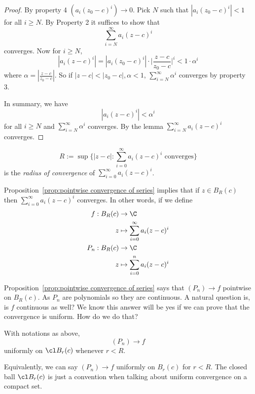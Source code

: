 \documentclass[a4paper]{article}
\theoremstyle{definition}
\begin{document}
\begin{proof}
  By property 4 \((a_i(z_0-c)^i)\to 0\). Pick \(N\) such that \(|a_i(z_0-c)^i|<1\) for all \(i\geq N\). By Property 2 it suffices to show that
  \[
    \sum_{i=N}^{\infty}a_i(z-c)^i
  \]
  converges. Now for \(i\geq N\),
  \[
    \label{eqn:fundamental est}
    \boxed{
    |a_i(z-c)^i| = |a_i(z_0-c)^i| \cdot \Big| \frac{z-c}{z_0-c} \Big|^i < 1\cdot \alpha^i
    }
    \tag*{Fundamental Estimate for Power Series}
    \]
  where \(\alpha = |\frac{z-c}{z_0-c}|\). So if \(|z-c| < |z_0-c|,\alpha<1\), \(\sum_{i=N}^{\infty}\alpha^i \) converges by property 3.

  In summary, we have
  \[
|a_i(z-c)^i| < \alpha^i
\]
for all \(i\geq N\) and \(\sum_{i=N}^{\infty}\alpha^i \) converges. By the lemma \(\sum_{i=N}^{\infty}a_i(z-c)^i \) converges.
\end{proof}

\begin{defi}
  \[
    R := \sup \{ |z-c|: \sum_{i=0}^{\infty}a_i (z-c)^i \text{ converges}\}
  \]
  is the \emph{radius of convergence} of \(\sum_{i=0}^{\infty}a_i(z-c)^i \).
\end{defi}

Proposition~\ref{prop:pointwise convergence of series} implies that if \(z\in B_R(c)\) then \(\sum_{i=0}^{\infty}a_i(z-c)^i \) converges. In other words, if we define
\begin{align*}
  f: B_R(c) &\to \C \\
  z &\mapsto \sum_{i=0}^{\infty} a_i(z-c)^i \\
  P_n: B_R(c) &\to \C \\
  z &\mapsto \sum_{i=0}^{n} a_i(z-c)^i
\end{align*}

Proposition~\ref{prop:pointwise convergence of series} says that \((P_n)\to f\) pointwise on \(B_R(c)\). As \(P_n\) are polynomials so they are continuous. A natural question is, is \(f\) continuous as well? We know this answer will be yes if we can prove that the convergence is uniform. How do we do that?

\begin{thm}
  With notations as above,
  \[
(P_n)\to f
\]
uniformly on \(\cl B_r(c)\) whenever \(r<R\).
\end{thm}

\begin{note}
  Equivalently, we can say \((P_n)\to f\) uniformly on \(B_r(c)\) for \(r<R\). The closed ball \(\cl B_r(c)\) is just a convention when talking about uniform convergence on a compact set.
\end{note}
\end{document}
